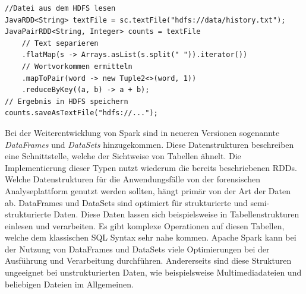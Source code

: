 \clearpage

\begin{lstlisting}[label={lst:spark_rdd_word_count},caption= Beispielimplementierung eines Spark RDDs ,captionpos=b,frame=single,style=customjava]
//Datei aus dem HDFS lesen
JavaRDD<String> textFile = sc.textFile("hdfs://data/history.txt");
JavaPairRDD<String, Integer> counts = textFile
    // Text separieren
    .flatMap(s -> Arrays.asList(s.split(" ")).iterator())
    // Wortvorkommen ermitteln
    .mapToPair(word -> new Tuple2<>(word, 1))
    .reduceByKey((a, b) -> a + b);
// Ergebnis in HDFS speichern
counts.saveAsTextFile("hdfs://...");
\end{lstlisting}


\noindent
Bei der Weiterentwicklung von Spark sind in neueren Versionen sogenannte \textit{DataFrames} und \textit{DataSets} hinzugekommen. Diese Datenstrukturen beschreiben eine Schnittstelle, welche der Sichtweise von Tabellen ähnelt. Die Implementierung dieser Typen nutzt wiederum die bereits beschriebenen RDDs.\\
Welche Datenstrukturen für die Anwendungsfälle von der forensischen Analyseplattform genutzt werden sollten, hängt primär von der Art der Daten ab.
DataFrames und DataSets sind optimiert für strukturierte und semi-strukturierte Daten. Diese Daten lassen sich beispielsweise in Tabellenstrukturen einlesen und verarbeiten. Es gibt komplexe Operationen auf diesen Tabellen, welche dem klassischen SQL Syntax sehr nahe kommen. Apache Spark kann bei der Nutzung von DataFrames und DataSets viele Optimierungen bei der Ausführung und Verarbeitung durchführen. Andererseits sind diese Strukturen ungeeignet bei unstrukturierten Daten, wie beispielsweise Multimediadateien und beliebigen Dateien im Allgemeinen.\cite[S. 66 ff.]{data_processing_spark2}\\


